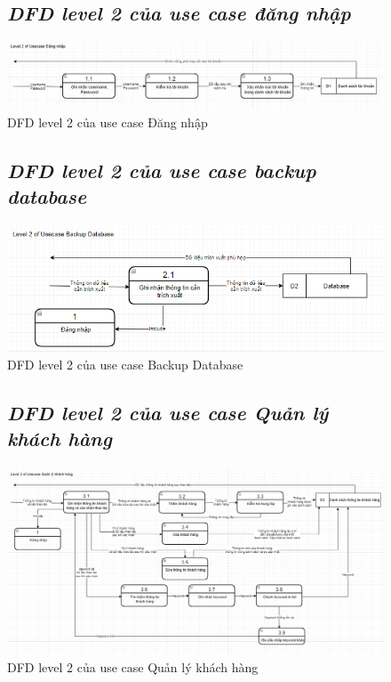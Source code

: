\documentclass{report}
\begin{document}
\begin{figure}[htp]
    \subsection{\textit{DFD level 2 của use case đăng nhập}}
    \centering
    \includegraphics[scale = 0.6]{image/DFD_level2_dangnhap.PNG}
    \caption{DFD level 2 của use case Đăng nhập}
\end{figure}

\begin{figure}[htp]
    \subsection{\textit{DFD level 2 của use case backup database}}
    \centering
    \includegraphics[scale = 0.8]{image/DFD_level2_backupDB.PNG}
    \caption{DFD level 2 của use case Backup Database}
\end{figure}

\begin{figure}[htp]
    \subsection{\textit{DFD level 2 của use case Quản lý khách hàng}}
    \centering
    \includegraphics[scale = 0.55]{image/DFD_level2_qlkh.PNG}
    \caption{DFD level 2 của use case Quản lý khách hàng}
\end{figure}
\end{document}
